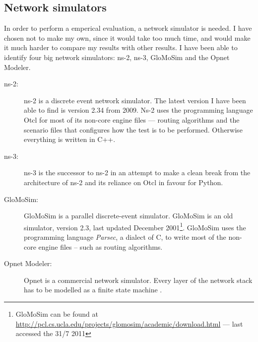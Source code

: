 \subsection{Network simulators}
\label{section:network_simulators}

In order to perform a emperical evaluation, a network simulator is needed. I have chosen not to make my own, since it would take too much time, and would make it much harder to compare my results with other results. I have been able to identify four big network simulators: ns-2, ns-3, GloMoSim and the Opnet Modeler.

\begin{description}
\item[ns-2:] ns-2 is a discrete event network simulator. The latest version I have been able to find is version 2.34 from 2009. Ns-2 uses the programming language Otcl for most of its non-core engine files --- routing algorithms and the scenario files that configures how the test is to be performed. Otherwise everything is written in C++.
\item[ns-3:] ns-3 is the successor to ns-2 in an attempt to make a clean break from the architecture of ns-2 and its reliance on Otcl in favour for Python.
\item[GloMoSim:] GloMoSim is a parallel discrete-event simulator. GloMoSim is an old simulator, version 2.3, last updated December 2001\footnote{GloMoSim can be found at \url{http://pcl.cs.ucla.edu/projects/glomosim/academic/download.html} --- last accessed the 31/7 2011}. GloMoSim uses the programming language \emph{Parsec}, a dialect of C, to write most of the non-core engine files -- such as routing algorithms. 
\item[Opnet Modeler:] Opnet is a commercial network simulator. Every layer of the network stack has to be modelled as a finite state machine \cite{MANcom}. 
\end{description}

